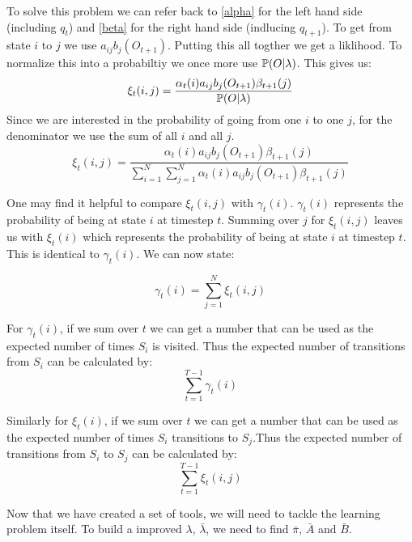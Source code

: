 To solve this problem we can refer back to \ref{alpha} for the left hand side (including $q_t$) and \ref{beta} for the right hand side (indlucing $q_{t+1}$). To get from state $i$ to $j$ we use $a_{ij} b_j(O_{t+1})$. Putting this all togther we get a liklihood. To normalize this into a probabiltiy we once more use $\mathbb{P} (O|\lambda)$. This gives us:
\begin{equation}
    \xi_t(i,j) = \dfrac{\alpha_t(i) a_{ij} b_j(O_{t+1}) \beta_{t+1}(j)}{\mathbb{P} (O|\lambda)}
\end{equation}
Since we are interested in the probability of going from one $i$ to one $j$, for the denominator we use the sum of all $i$ and all $j$. 
\begin{equation}
    \xi_t(i,j) = \dfrac{\alpha_t(i) a_{ij} b_j(O_{t+1}) \beta_{t+1}(j)}{\sum_{i=1}^N \sum_{j=1}^N \alpha_t(i) a_{ij} b_j(O_{t+1}) \beta_{t+1}(j)}
\end{equation}

One may find it helpful to compare $\xi_t(i,j)$ with $\gamma_t(i)$. $\gamma_t(i)$ represents the probability of being at state $i$ at timestep $t$. Summing over $j$ for $\xi_t(i,j)$ leaves us with $\xi_t(i)$ which represents the probability of being at state $i$ at timestep $t$. This is identical to $\gamma_t(i)$. We can now state: 

\begin{equation}
    \gamma_t(i) = \sum_{j=1}^N \xi_t(i,j)
\end{equation}

For $\gamma_t(i)$, if we sum over $t$ we can get a number that can be used as the expected number of times $S_i$ is visited. Thus the expected number of transitions from $S_i$ can be calculated by:
\begin{equation}
    \sum_{t=1}^{T-1} \gamma_t(i)
\end{equation}

Similarly for $\xi_t(i)$, if we sum over $t$ we can get a number that can be used as the expected number of times $S_i$ transitions to $S_j$.Thus the expected number of transitions from $S_i$ to $S_j$ can be calculated by:
\begin{equation}
    \sum_{t=1}^{T-1} \xi_t(i,j)
\end{equation}



Now that we have created a set of tools, we will need to tackle the learning problem itself. To build a improved $\lambda$, $\bar{\lambda}$, we need to find $\bar{\pi}$, $\bar{A}$ and $\bar{B}$.

